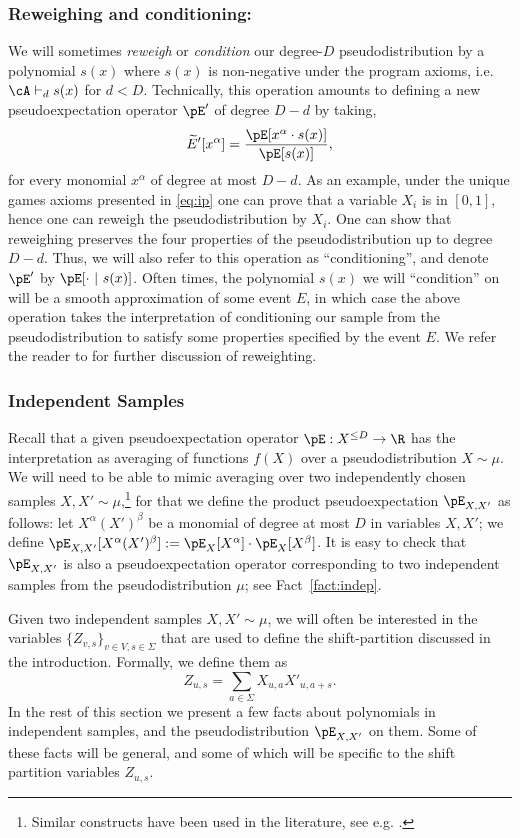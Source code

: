 \subsubsection{Reweighing and conditioning:} 
We will sometimes {\em reweigh} or {\em condition} our degree-$D$ pseudodistribution by a polynomial $s(x)$ where $s(x)$ is non-negative under the program axioms, i.e. $\cA \vdash_{d} s(x)$ for $d < D$. Technically, this operation amounts to defining a new pseudoexpectation operator $\pE'$  of degree $D-d$ by taking, 
\[\widetilde{E}'[x^{\alpha}] = \frac{\pE[x^{\alpha} \cdot s(x)]}{\pE[s(x)]},\] 
for every monomial $x^{\alpha}$ of degree at most $D - d$. As an example, under the unique games axioms presented in \ref{eq:ip} one can prove that a variable $X_i$ is in $[0,1]$, hence one can reweigh the pseudodistribution by $X_i$. One can show that reweighing preserves the four properties of the pseudodistribution up to degree $D - d$.
Thus, we will also refer to this operation as ``conditioning'', and denote $\pE'$ by $\pE[\cdot ~|~ s(x)]$. Often times, the polynomial $s(x)$ we will ``condition'' on 
will be a smooth approximation of some event $E$, in which case the above operation takes the interpretation of conditioning our sample from the pseudodistribution to satisfy some properties specified by the event $E$. We refer the reader to \cite{BarakRS11,BKS17} for further discussion of reweighting.


\subsubsection{Independent Samples}\label{sec:ind_samples}
Recall that a given pseudoexpectation operator $\pE: X^{\leq D} \rightarrow \R$ has the interpretation as averaging of functions $f(X)$ over a pseudodistribution $X\sim\mu$.  
We will need to be able to mimic averaging over two 
independently chosen samples $X,X'\sim \mu$,\footnote{Similar constructs have been used in the literature, see e.g. \cite{BarakKS14}.} for that 
we define the product pseudoexpectation $\pE_{X,X'}$ 
as follows: let $X^{\alpha}(X')^{\beta}$ be a monomial 
of degree at most $D$ in variables $X,X'$; we define  $\pE_{X,X'}[X^{\alpha}(X')^{\beta}] := \pE_{X}[X^{\alpha}] \cdot \pE_X[X^{\beta}]$. It is easy to check that $\pE_{X,X'}$ 
is also a pseudoexpectation operator corresponding to two 
independent samples from the pseudodistribution $\mu$; 
see Fact~\ref{fact:indep}.

Given two independent samples $X,X'\sim \mu$, we will often be
interested in the variables $\{Z_{v,s}\}_{v\in V, s\in\Sigma}$ 
that are used to define the shift-partition discussed in the introduction. Formally, we define them as
\[
Z_{u,s} = \sum_{a \in \Sigma} X_{u,a} X'_{u,a+s}.
\]
In the rest of this section we present a few facts about polynomials in independent samples,
and the pseudodistribution $\pE_{X,X'}$ on them. 
Some of these facts will be general, and some of which 
will be specific to the shift partition variables $Z_{u,s}$.

